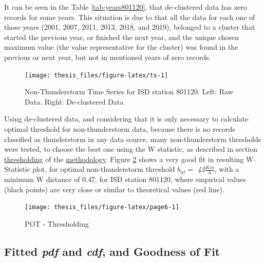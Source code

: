 \documentclass[12pt,oneside]{reedthesis}
\begin{document}
It can be seen in the Table \ref{tab:years801120}, that de-clustered data has zero records for some years. This situation is due to that all the data for each one of those years (2001, 2007, 2011, 2013, 2018, and 2019), belonged to a cluster that started the previous year, or finished the next year, and the unique chosen maximum value (the value representative for the cluster) was found in the previous or next year, but not in mentioned years of zero records.
\begin{figure}

{\centering \texttt{[image: thesis\_files/figure-latex/ts-1]} 

}

\caption{Non-Thunderstorm Time Series for ISD station 801120. Left: Raw Data. Right: De-clustered Data}\label{fig:ts}
\end{figure}
Using de-clustered data, and considering that it is only necessary to calculate optimal threshold for non-thunderstorm data, because there is no records classified as thunderstorm in any data source, many non-thunderstorm thresholds were tested, to choose the best one using the W statistic, as described in section \protect\hyperlink{thresholding}{thresholding} of the \protect\hyperlink{rmd-method}{methodology}. Figure \ref{fig:page6} shows a very good fit in resulting W-Statistic plot, for optimal non-thunderstorm threshold \(b_{nt} =\) \emph{42}\(\frac{Km}{h}\), with a minimum W distance of 0.47, for ISD station 801120, where empirical values (black points) are very close or similar to theoretical values (red line).

\footnotesize
\begin{figure}

{\centering \texttt{[image: thesis\_files/figure-latex/page6-1]} 

}

\caption{POT - Thresholding}\label{fig:page6}
\end{figure}
\normalsize

\hypertarget{fitted-pdf-and-cdf-and-goodness-of-fit}{%
\subsection{\texorpdfstring{Fitted \emph{pdf} and \emph{cdf}, and Goodness of Fit}{Fitted pdf and cdf, and Goodness of Fit}}\label{fitted-pdf-and-cdf-and-goodness-of-fit}}
\end{document}
